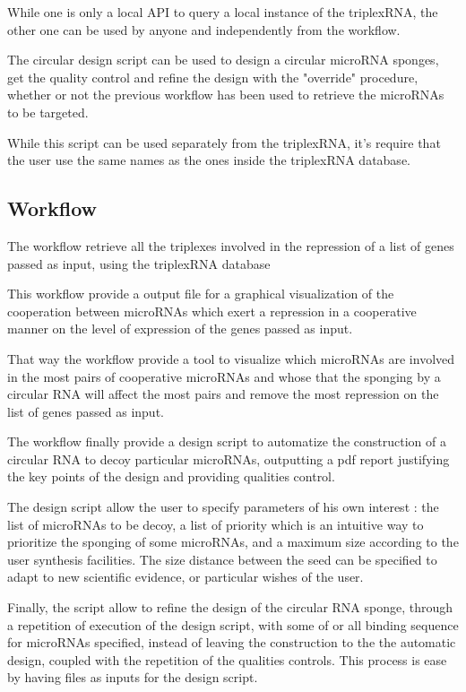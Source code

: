 \documentclass[a4paper,12pt]{report}
\begin{document}
While one is only a local API to query a local instance of the triplexRNA, the other one can be used by anyone and independently from the workflow.

The circular design script can be used to design a circular microRNA sponges, get the quality control and refine the design with the "override" procedure, whether or not the previous workflow has been used to retrieve the microRNAs to be targeted.

While this script can be used separately from the triplexRNA, it's require that the user use the same names as the ones inside the triplexRNA database. 


\subsection{Workflow}
The workflow retrieve all the triplexes involved in the repression of a list of genes passed as input, using the triplexRNA database\cite{triplex}

This workflow provide a output file for a graphical visualization of the cooperation between microRNAs which exert a repression in a cooperative manner on the level of expression of the genes passed as input.

That way the workflow provide a tool to visualize which microRNAs are involved in the most pairs of cooperative microRNAs and whose that the sponging by a circular RNA will affect the most pairs and remove the most repression on the list of genes passed as input.

The workflow finally provide a design script to automatize the construction of a circular RNA to decoy particular microRNAs, outputting a pdf report justifying the key points of the design and providing qualities control.

The design script allow the user to specify parameters of his own interest : the list of microRNAs to be decoy, a list of priority which is an intuitive way to prioritize the sponging of some microRNAs, and a maximum size according to the user synthesis facilities. The size distance between the seed can be specified to adapt to new scientific evidence, or particular wishes of the user.

Finally, the script allow to refine the design of the circular RNA sponge, through a repetition of execution of the design script, with some of or all binding sequence for microRNAs specified, instead of leaving the construction to the the automatic design, coupled with the repetition of the qualities controls. This process is ease by having files as inputs for the design script.
\end{document}
